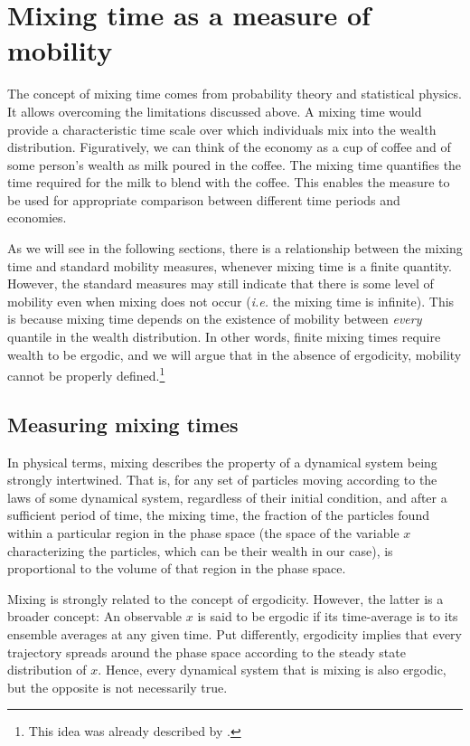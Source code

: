 \documentclass[11pt]{article}
\newcommand{\ie}{{\it i.e.}\xspace}
\numberwithin{equation}{section}
\begin{document}
\FloatBarrier
\section{Mixing time as a measure of mobility}
\label{sec:mixing-time}

The concept of mixing time comes from probability theory and statistical physics. It allows overcoming the limitations discussed above. A mixing time would provide a characteristic time scale over which individuals mix into the wealth distribution. Figuratively, we can think of the economy as a cup of coffee and of some person's wealth as milk poured in the coffee. The mixing time quantifies the time required for the milk to blend with the coffee. This enables the measure to be used for appropriate comparison between different time periods and economies.

As we will see in the following sections, there is a relationship between the mixing time and standard mobility measures, whenever mixing time is a finite quantity. However, the standard measures may still indicate that there is some level of mobility even when mixing does not occur (\ie the mixing time is infinite). This is because mixing time depends on the existence of mobility between \textit{every} quantile in the wealth distribution. In other words, finite mixing times require wealth to be ergodic, and we will argue that in the absence of ergodicity, mobility cannot be properly defined.\footnote{This idea was already described by \citet{Mcfarland1970}.}

\subsection{Measuring mixing times}

In physical terms, mixing describes the property of a dynamical system being strongly intertwined. That is, for any set of particles moving according to the laws of some dynamical system, regardless of their initial condition, and after a sufficient period of time, the mixing time, the fraction of the particles found within a particular region in the phase space (the space of the variable $x$ characterizing the particles, which can be their wealth in our case), is proportional to the volume of that region in the phase space.

Mixing is strongly related to the concept of ergodicity. However, the latter is a broader concept: An observable $x$ is said to be ergodic if its time-average is to its ensemble averages at any given time. Put differently, ergodicity implies that every trajectory spreads around the phase space according to the steady state distribution of $x$. Hence, every dynamical system that is mixing is also ergodic, but the opposite is not necessarily true.
\end{document}
